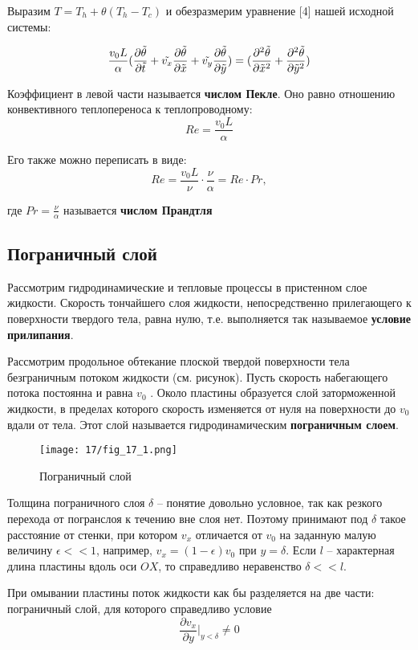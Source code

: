 \bigskip
Выразим $T = T_h + \theta (T_h - T_c)$ и обезразмерим уравнение [4] нашей исходной системы:

$$\frac{v_0L}{\alpha} (\frac{\partial \Tilde{\theta}}{\partial \Tilde{t}} + \Tilde{v_x}\frac{\partial \Tilde{\theta}}{\partial \Tilde{x}} + \Tilde{v_y}\frac{\partial \Tilde{\theta}}{\partial \Tilde{y}}) = (\frac{\partial^2 \Tilde{\theta}}{\partial \Tilde{x}^2} + \frac{\partial^2 \Tilde{\theta}}{\partial \Tilde{y}^2})$$

Коэффициент в левой части называется \textbf{числом Пекле}. Оно равно отношению конвективного теплопереноса к теплопроводному:
$$Re = \frac{v_0L}{\alpha}$$

Его также можно переписать в виде:
$$Re = \frac{v_0L}{\nu} \cdot \frac{\nu}{\alpha} = Re \cdot Pr,$$

где $Pr = \frac{\nu}{\alpha}$ называется \textbf{числом Прандтля}


\subsection{Пограничный слой}

Рассмотрим гидродинамические и тепловые процессы в пристенном слое жидкости. Скорость тончайшего слоя жидкости, непосредственно прилегающего к поверхности твердого тела, равна нулю, т.е. выполняется так называемое \textbf{условие прилипания}.

Рассмотрим продольное обтекание плоской твердой поверхности тела безграничным потоком жидкости (см. рисунок). Пусть скорость набегающего потока постоянна и равна $v_0$ . Около пластины образуется слой заторможенной жидкости, в пределах которого скорость изменяется от нуля на поверхности до $v_0$ вдали от тела. Этот слой называется гидродинамическим \textbf{пограничным слоем}.

\begin{figure}[h]
  \centering
  \texttt{[image: 17/fig\_17\_1.png]}
  \caption{Пограничный слой}
\end{figure}

Толщина пограничного слоя $\delta$ – понятие довольно условное, так как резкого перехода от погранслоя к течению вне слоя
нет. Поэтому принимают под $\delta$ такое расстояние от стенки, при котором $v_x$ отличается от $v_0$ на заданную малую величину $\epsilon << 1$, например, $v_x = (1-\epsilon)v_0$ при $y=\delta$. Если $l$ – характерная длина пластины вдоль оси $OX$, то справедливо неравенство $\delta << l$.

\bigskip
При омывании пластины поток жидкости как бы разделяется на две части: пограничный слой, для которого справедливо условие
$$\frac{\partial v_x}{\partial y}\Big|_{y<\delta} \neq 0$$

